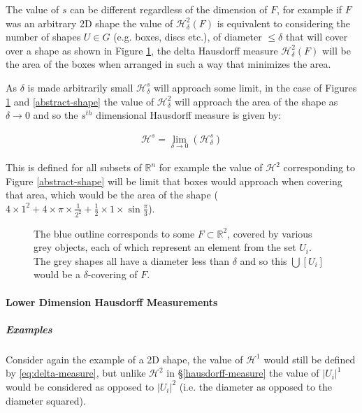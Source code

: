 \documentclass[a4paper,11pt,twoside]{article}
\begin{document}
The value of \(s\) can be different regardless of the dimension of \(F\), for example if \(F\) was an arbitrary 2D shape the value of \(\mathcal{H}_{\delta}^{2}\left(F\right)\)
is equivalent to considering the number of shapes \(U\in G\) (e.g. boxes, discs etc.), of
diameter \(\leq \delta\) that will cover over a shape as shown in Figure
\ref{hausdorff-covering}, the delta Hausdorff measure
\(\mathcal{H}^{2}_{\delta} \left(F\right)\) will be the area of the boxes when
arranged in such a way that minimizes the area.

As \(\delta\) is made arbitrarily small \(\mathcal{H}_{\delta}^{s}\) will approach some limit, in the case of Figures \ref{hausdorff-covering}  and \ref{abstract-shape} the value of \(\mathcal{H}^{2}_{\delta}\) will approach the area of the shape as \(\delta \rightarrow 0\) and so the \(s^{th}\) dimensional Hausdorff measure is given by:

\begin{align}
\mathcal{H}^{s} = \lim_{\delta \rightarrow 0}\left( \mathcal{H}^{s}_{\delta} \right) \label{eq:limit-haus}
\end{align}

This is defined for all subsets of \(\mathbb{R}^n\) for example the value of  \(\mathcal{H}^{2}\) corresponding to Figure \ref{abstract-shape} will be limit that boxes would approach when covering that area, which would be the area of the shape (\(4\times 1^2 + 4\times \pi\times \frac{1}{2^2} + \frac{1}{2}\times 1 \times \sin{\frac{\pi}{3}}\)).





\begin{figure}
\centering

\caption{\label{hausdorff-covering}The blue outline corresponds to some \(F \subset \mathbb{R}^{2}\), covered by various grey objects, each of which represent an element from the set \(U_{i}\). The grey shapes all have a diameter less than \(\delta\) and so this  \(\bigcup \left[U_{i}\right]\) would be a \(\delta\)-covering of \(F\).}
\end{figure}




\paragraph{Lower Dimension Hausdorff Measurements}
\label{sec:org30f9dbb}
\subparagraph{Examples}
\label{sec:org47be4fd}
Consider again the example of a 2D shape, the value of \(\mathcal{H}^{1}\) would still be defined by \eqref{eq:delta-measure}, but unlike \(\mathcal{H}^{2}\) in \S \ref{hausdorff-measure} the value of \(\left\lvert U_i \right\rvert^1\) would be considered as opposed to \(\left\lvert U_i \right\rvert^2\) (i.e. the diameter as opposed to the diameter squared).
\end{document}
